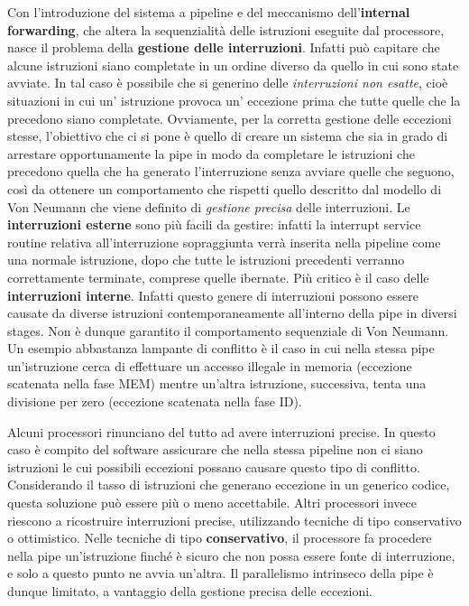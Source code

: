 Con l'introduzione del sistema a pipeline e del meccanismo dell'\textbf{internal forwarding}, che altera la sequenzialità delle istruzioni eseguite dal processore, nasce il problema della \textbf{gestione delle interruzioni}. 
Infatti può capitare che alcune istruzioni siano completate in un ordine diverso da quello in cui sono state avviate. In tal caso è possibile che si generino delle \textit{interruzioni non esatte}, cioè situazioni in cui un' istruzione provoca un' eccezione prima che tutte quelle che la precedono siano completate. Ovviamente, per la corretta gestione delle eccezioni stesse, l'obiettivo che ci si pone è quello di creare un sistema che sia in grado di arrestare opportunamente la pipe in modo da completare le istruzioni che precedono quella che ha generato l'interruzione senza avviare quelle che seguono, così da ottenere un comportamento che rispetti quello descritto dal modello di Von Neumann che viene definito di \textit{gestione precisa} delle interruzioni.
Le \textbf{interruzioni esterne} sono più facili da gestire: infatti la interrupt service routine relativa all'interruzione sopraggiunta verrà inserita nella pipeline come una normale istruzione, dopo che tutte le istruzioni precedenti verranno correttamente terminate, comprese quelle ibernate. 
Più critico è il caso delle \textbf{interruzioni interne}. Infatti questo genere di interruzioni possono essere causate da diverse istruzioni contemporaneamente all'interno della pipe in diversi stages. Non è dunque garantito il comportamento sequenziale di Von Neumann. Un esempio abbastanza lampante di conflitto è il caso in cui nella stessa pipe un'istruzione cerca di effettuare un accesso illegale in memoria (eccezione scatenata nella fase MEM) mentre un'altra istruzione, successiva, tenta una divisione per zero (eccezione scatenata nella fase ID).

\noindent Alcuni processori rinunciano del tutto ad avere interruzioni precise. In questo caso è compito del software assicurare che nella stessa pipeline non ci siano istruzioni le cui possibili eccezioni possano causare questo tipo di conflitto. Considerando il tasso di istruzioni che generano eccezione in un generico codice, questa soluzione può essere più o meno accettabile. Altri processori invece riescono a ricostruire interruzioni precise, utilizzando tecniche di tipo conservativo o ottimistico. 
Nelle tecniche di tipo \textbf{conservativo}, il processore fa procedere nella pipe un'istruzione finché è sicuro che non possa essere fonte di interruzione, e solo a questo punto ne avvia un'altra. Il parallelismo intrinseco della pipe è dunque limitato, a vantaggio della gestione precisa delle eccezioni. 

